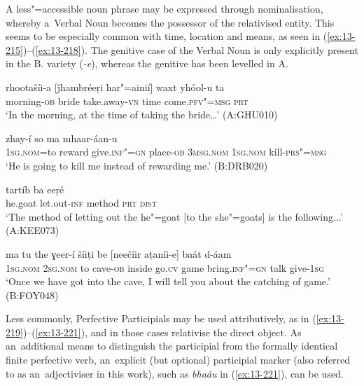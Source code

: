 A less"=accessible noun phrase may be expressed through nominalisation, whereby a~Verbal Noun becomes the possessor of the relativised entity. This seems to be especially common with time, location and means, as seen in (\ref{ex:13-215})--(\ref{ex:13-218}). The genitive case of the Verbal Noun is only explicitly present in the B. variety (\textit{-e}), whereas the genitive has been levelled in A.

\begin{exe}
\ex
\label{ex:13-215}
\gll rhootašíi-a [ǰhambréeṛi har"=ainií] waxt  yhóol-u ta \\
morning-\textsc{ob} bride take.away-\textsc{vn} time come.\textsc{pfv"=msg} \textsc{prt} \\
\glt `In the morning, at the time of taking the bride{\ldots}' (A:GHU010)

\ex
\label{ex:13-216}
\gll [máa=the bašéš deníi-e] zhay-í so  ma mhaar-áan-u \\
\textsc{1sg.nom}=to reward give.\textsc{inf"=gn} place-\textsc{ob} \textsc{3msg.nom} \textsc{1sg.nom} kill-\textsc{prs"=msg} \\
\glt `He is going to kill me instead of rewarding me.' (B:DRB020)

\ex
\label{ex:13-217}
 tartíb ba eeṛé  \\
he.goat let.out-\textsc{inf} method \textsc{prt} \textsc{dist} \\
\glt `The method of letting out the he"=goat [to the she"=goats] is the following...' (A:KEE073)

\ex
\label{ex:13-218}
\gll ma tu the ɣeer-í šíiṭi be [neečíir  aṭaníi-e] baát d-áam \\
\textsc{1sg.nom} \textsc{2sg.nom} to cave-\textsc{ob} inside go.\textsc{cv} game  bring.\textsc{inf"=gn} talk give-\textsc{1sg} \\
\glt `Once we have got into the cave, I will tell you about the catching of game.' (B:FOY048) 
\end{exe}

Less commonly, Perfective Participials may be used attributively, as in (\ref{ex:13-219})--(\ref{ex:13-221}), and in those cases relativise the direct object. As an~additional means to distinguish the participial from the formally identical finite perfective verb, an~explicit (but optional) participial marker (also referred to as an~adjectiviser in this work), such as \textit{bhaáu} in (\ref{ex:13-221}), can be used.

